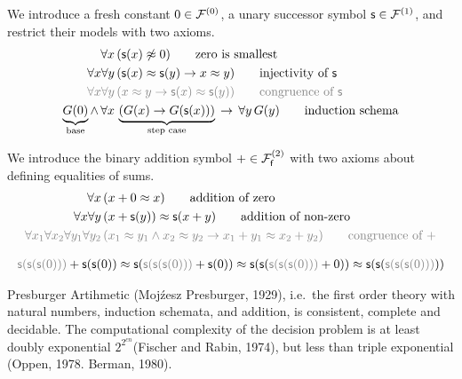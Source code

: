 \begin{definition}
	\label{def:natural:numbers:axioms}
	We introduce a fresh constant $0\in\mcFn[0]$, 
	a unary successor symbol $\msucc\in\mcFn[1]$,
	and restrict their models with two axioms. 
\begin{align*}
\forall x\, &(\msucc(x) \mNE 0)
\tag*{zero is smallest} 
\\ %
\forall x \forall y\, &(\msucc(x) \mEQ \msucc(y) \limp x \mEQ y)
\tag*{injectivity of $\msucc$}
\\
\colG\forall x\forall y\,&\colG(x\mEQ y \limp \msucc(x)\mEQ\msucc(y))
\tag*{congruence of $\msucc$}
\\ 
\underbrace{G(0)}_{\text{base}} 
\land\, \forall x\,&
\underbrace{
	\left(G(x) \limp G(\msucc(x))\right)
}_{\text{step case}}
\,\limp\, \forall y\,G(y)
\tag*{induction schema}
\end{align*}
\end{definition}

\begin{definition}
	[Addition]
	\label{def:addition:axioms}
	We introduce the binary addition symbol $+\in\mcFfn[2]$ with two axioms about defining equalities of sums.
\begin{align*}
\forall x\,
&(x+0 \mEQ x) 
\tag*{addition of zero}\\
\forall x\forall y\,
&(x+\msucc(y)) \mEQ \msucc(x+y)
\tag*{addition of non-zero}
\\
\colG\forall x_1\forall x_2\forall y_1\forall y_2\,
&\colG (x_1\mEQ y_1\land x_2\mEQ y_2 \limp x_1+y_1\mEQ x_2+y_2)
\tag*{congruence of $+$}
\end{align*}
\end{definition}

\begin{example}
	\begin{gather*}
	{\colG \msucc(\msucc(\msucc(0)))} + \msucc(\msucc(0))
	\mEQ\msucc({\colG \msucc(\msucc(\msucc(0)))} + \msucc(0)) 
	\mEQ \msucc(\msucc(
	{\colG \msucc(\msucc(\msucc(0)))} + 0))
	\mEQ \msucc(\msucc(
	{\colG \msucc(\msucc(\msucc(0)))}))
	\end{gather*}
	\end{example}

\begin{theorem}Presburger Artihmetic (Moj\'{z}esz Presburger, 1929), i.e.~the first order theory with natural numbers, induction schemata, and addition, is consistent, complete and decidable. The computational complexity of the decision problem is at least doubly exponential $2^{2^{cn}}$(Fischer and Rabin, 1974), but less than triple exponential (Oppen, 1978. Berman, 1980).
\end{theorem}

